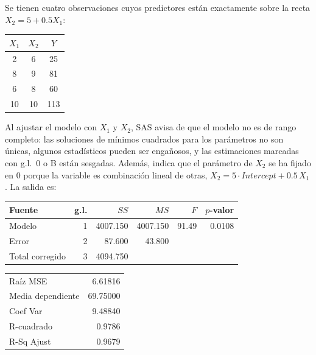 \begin{ejemplo}
  Se tienen cuatro observaciones cuyos predictores están exactamente sobre la recta
  $X_2=5+0.5X_1$:
  \begin{center}
    \renewcommand{\arraystretch}{1.15}
    \begin{tabular}{ccc}
      \toprule
      $X_1$ & $X_2$ & $Y$ \\
      \midrule
      2 & 6 & 25 \\
      8 & 9 & 81 \\
      6 & 8 & 60 \\
      10 & 10 & 113 \\
      \bottomrule
    \end{tabular}
  \end{center}
  Al ajustar el modelo con $X_1$ y $X_2$, SAS avisa de que el modelo no es de rango completo: las
  soluciones de mínimos cuadrados para los parámetros no son únicas, algunos estadísticos pueden
  ser engañosos, y las estimaciones marcadas con g.l.\ 0 o B están sesgadas. Además, indica que el
  parámetro de $X_2$ se ha fijado en 0 porque la variable es combinación lineal de otras,
  $X_2=5\cdot\textit{Intercept}+0.5\,X_1$. La salida es:
  \begin{center}
    \small
    \renewcommand{\arraystretch}{1.15}
    \begin{tabular}{lrrrrr}
      \toprule
      Fuente & g.l. & $SS$ & $MS$ & $F$ & $p$-valor \\
      \midrule
      Modelo & 1 & 4007.150 & 4007.150 & 91.49 & 0.0108 \\
      Error & 2 & 87.600 & 43.800 & & \\
      Total corregido & 3 & 4094.750 & & & \\
      \bottomrule
    \end{tabular}
    \qquad
    \begin{tabular}{lr}
      \toprule
      Raíz MSE & 6.61816 \\
      Media dependiente & 69.75000 \\
      Coef Var & 9.48840 \\
      R-cuadrado & 0.9786 \\
      R-Sq Ajust & 0.9679 \\
      \bottomrule
    \end{tabular}


\end{center}
\end{ejemplo}
